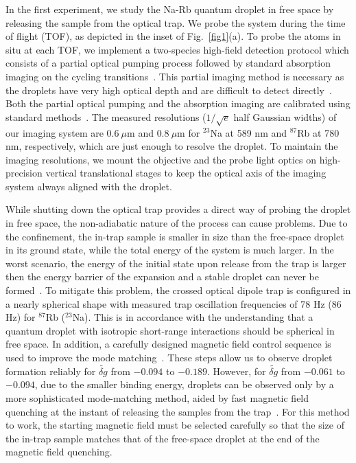 In the first experiment, we study the Na-Rb quantum droplet in free space 
by releasing the sample from the optical trap. We probe the system during the time of flight (TOF), as depicted in the inset of Fig.~\ref{fig1}(a).
To probe the atoms in situ at each TOF, we implement a two-species high-field detection protocol which consists of a partial optical pumping process followed by standard absorption imaging on the cycling transitions~\cite{Jia2020}.
This partial imaging method is necessary as the droplets have very high optical depth and are difficult to detect directly~\cite{ramanathan2012partial,semeghini2018self}. Both the partial optical pumping and the absorption imaging are calibrated using standard methods~\cite{reinaudi2007strong,hueck2017calibrating}. The measured resolutions ($1/\sqrt{e}$ half Gaussian widths) of our imaging system are $0.6~\mu$m and $0.8~\mu$m for $^{23}$Na at 589 nm and $^{87}$Rb at 780 nm, respectively, which are just enough to resolve the droplet. 
To maintain the imaging resolutions, we mount the objective and the probe 
light optics on high-precision vertical translational stages to keep the optical axis of the imaging system always aligned with the droplet.

While shutting down the optical trap provides a direct way of probing the droplet in free space, the non-adiabatic nature of the process can cause problems.
Due to the confinement, the in-trap sample is smaller in size than the free-space droplet in its ground state, while the total energy of the system is much larger. In the worst scenario, the energy of the initial state upon release from the trap is larger then the energy barrier of the
expansion and a stable droplet can never be formed~\cite{SM}. To mitigate this problem, the crossed optical dipole trap is configured in a nearly spherical shape with measured trap oscillation frequencies of 78 Hz (86 Hz) for $^{87}$Rb ($^{23}$Na). This is in accordance with the understanding that a quantum droplet with isotropic short-range interactions should be spherical in free space. In addition, a carefully designed magnetic field control sequence is used to improve the mode matching~\cite{SM}. These steps allow us to observe droplet formation reliably for $\widetilde{\delta g}$ from $-0.094$ to $-0.189$. However, for $\widetilde{\delta g}$ from $-0.061$ to $-0.094$, due to the smaller binding energy, droplets can be observed only by a more sophisticated mode-matching method, aided by fast magnetic field quenching at the instant of releasing the samples from the trap~\cite{SM}. For this method to work, the starting magnetic field must be selected carefully so that the size of the in-trap sample matches that of the free-space droplet at the end of the magnetic field quenching.


